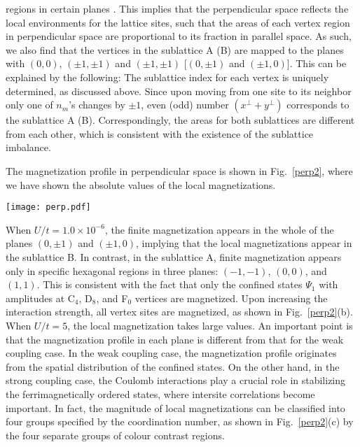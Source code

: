 \documentclass[aps,twocolumn,pra,superscriptaddress,amsmath,amssymb]{revtex4-1}
\begin{document}
regions in certain planes \cite{Sam}.
This implies that the perpendicular space reflects the local environments
for the lattice sites, such that the areas of each vertex region in perpendicular space are proportional to its fraction in parallel space.
As such, we also find that the vertices in the sublattice A (B) are mapped to the planes
with $(0,0)$, $(\pm 1,\pm 1)$ and $(\pm 1,\pm 1)$ [$(0, \pm 1)$ and $(\pm 1,0)$].
This can be explained by the following:
The sublattice index for each vertex is uniquely determined, as discussed above.
Since upon moving from one site to its neighbor only one
of $n_m$'s changes by $\pm 1$,
even (odd) number $(x^\perp+y^\perp)$ corresponds to the sublattice A (B).
Correspondingly, the areas for both sublattices are different from each other,
which is consistent with the existence of the sublattice imbalance.

The magnetization profile in perpendicular space is shown in Fig.~\ref{perp2}, where we have shown the absolute values of the local magnetizations.
\begin{figure*}
  \texttt{[image: perp.pdf]}
  \caption{
    Magnetization profile in the perpendicular space $(\tilde{x},\tilde{y})$
    for the Hubbard model with $N=448\,213$
    when (a) $U/t=1.0\times 10^{-6}$, (b) $U/t=1$, and (c) $U/t=5$.
    }
  \label{perp2}
\end{figure*}
When $U/t=1.0\times 10^{-6}$,
the finite magnetization appears in the whole of
the planes $(0,\pm 1)$ and $(\pm 1,0)$,
implying that the local magnetizations appear in the sublattice B.
In contrast, in the sublattice A,
finite magnetization appears only in specific hexagonal regions
in three planes: $(-1, -1)$, $(0,0)$, and $(1, 1)$.
This is consistent with the fact that
only the confined states $\Psi_1$ with amplitudes
at C$_4$, D$_8$, and F$_0$ vertices are magnetized.
Upon increasing the interaction strength, all vertex sites are magnetized,
as shown in Fig.~\ref{perp2}(b).
When $U/t=5$, the local magnetization takes large values.
An important point is that the magnetization profile in each plane
is different from that for the weak coupling case.
In the weak coupling case, the magnetization profile originates from
the spatial distribution of the confined states.
On the other hand, in the strong coupling case,
the Coulomb interactions play a crucial role in stabilizing
the ferrimagnetically ordered states,
where intersite correlations become important.
In fact, the magnitude of local magnetizations
can be classified into four groups specified by the coordination number,
as shown in Fig.~\ref{perp2}(c) by the four separate groups of colour contrast regions.
\end{document}
